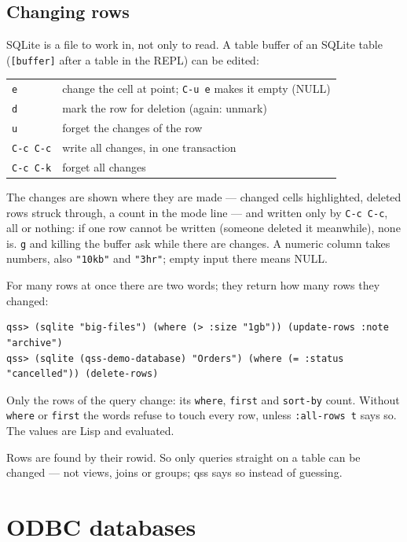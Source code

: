 \documentclass[
  paper=a4, fontsize=11pt, parskip=half, headings=small,
  toc=bibliography, numbers=noenddot, DIV=12
]{scrreprt}
\newcommand{\code}[1]{\texttt{#1}}
\newcommand{\kbd}[1]{\texttt{#1}}
\newcommand{\qss}{\textsf{qss}}
\begin{document}
\section{Changing rows}\label{sec:changing}

SQLite is a file to work in, not only to read. A table buffer of an SQLite table
(\code{[buffer]} after a table in the REPL) can be edited:

\noindent\begin{tabularx}{\linewidth}{@{}lX@{}}
\toprule
\kbd{e} & change the cell at point; \kbd{C-u e} makes it empty (NULL) \\
\kbd{d} & mark the row for deletion (again: unmark) \\
\kbd{u} & forget the changes of the row \\
\kbd{C-c C-c} & write all changes, in one transaction \\
\kbd{C-c C-k} & forget all changes \\
\bottomrule
\end{tabularx}

The changes are shown where they are made --- changed cells highlighted, deleted
rows struck through, a count in the mode line --- and written only by
\kbd{C-c C-c}, all or nothing: if one row cannot be written (someone deleted it
meanwhile), none is. \kbd{g} and killing the buffer ask while there are
changes. A numeric column takes numbers, also \code{"10kb"} and \code{"3hr"};
empty input there means NULL.

For many rows at once there are two words; they return how many rows they
changed:

\begin{Verbatim}
qss> (sqlite "big-files") (where (> :size "1gb")) (update-rows :note "archive")
qss> (sqlite (qss-demo-database) "Orders") (where (= :status "cancelled")) (delete-rows)
\end{Verbatim}

Only the rows of the query change: its \code{where}, \code{first} and
\code{sort-by} count. Without \code{where} or \code{first} the words refuse to
touch every row, unless \code{:all-rows t} says so. The values are Lisp and
evaluated.

Rows are found by their rowid. So only queries straight on a table can be
changed --- not views, joins or groups; \qss{} says so instead of guessing.

\chapter{ODBC databases}\label{chap:odbc}
\end{document}
